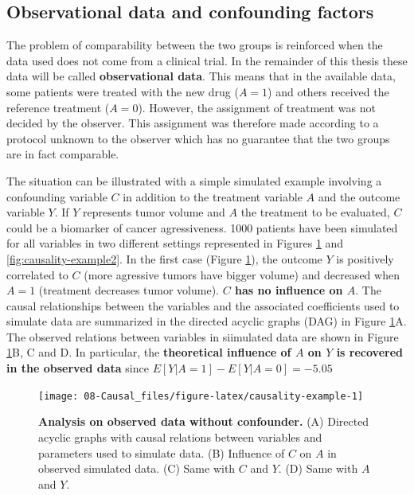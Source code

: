 \documentclass[a4paper,12pt,twoside,onecolumn,openright,final,oldfontcommands]{memoir}
\begin{document}
\subsection{Observational data and confounding
factors}\label{observational-data-and-confounding-factors}

The problem of comparability between the two groups is reinforced when
the data used does not come from a clinical trial. In the remainder of
this thesis these data will be called \textbf{observational data}. This
means that in the available data, some patients were treated with the
new drug (\(A=1\)) and others received the reference treatment
(\(A=0\)). However, the assignment of treatment was not decided by the
observer. This assignment was therefore made according to a protocol
unknown to the observer which has no guarantee that the two groups are
in fact comparable.

The situation can be illustrated with a simple simulated example
involving a confounding variable \(C\) in addition to the treatment
variable \(A\) and the outcome variable \(Y\). If \(Y\) represents tumor
volume and \(A\) the treatment to be evaluated, \(C\) could be a
biomarker of cancer agressiveness. 1000 patients have been simulated for
all variables in two different settings represented in Figures
\ref{fig:causality-example} and \ref{fig:causality-example2}. In the
first case (Figure \ref{fig:causality-example}), the outcome \(Y\) is
positively correlated to \(C\) (more agressive tumors have bigger
volume) and decreased when \(A=1\) (treatment decreases tumor volume).
\textbf{\(C\) has no influence on \(A\)}. The causal relationships
between the variables and the associated coefficients used to simulate
data are summarized in the directed acyclic graphs (DAG) in Figure
\ref{fig:causality-example}A. The observed relations between variables
in siimulated data are shown in Figure \ref{fig:causality-example}B, C
and D. In particular, the \textbf{theoretical influence of \(A\) on
\(Y\) is recovered in the observed data} since
\(E[Y|A=1]-E[Y|A=0]=-5.05\)

\begin{figure}

{\centering \texttt{[image: 08-Causal\_files/figure-latex/causality-example-1]} 

}

\caption[Analysis on observed data without confounder]{\textbf{Analysis on observed data
without confounder.} (A) Directed acyclic graphs with causal relations
between variables and parameters used to simulate data. (B) Influence of
\(C\) on \(A\) in observed simulated data. (C) Same with \(C\) and
\(Y\). (D) Same with \(A\) and \(Y\).}\label{fig:causality-example}
\end{figure}
\end{document}
